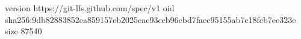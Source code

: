 version https://git-lfs.github.com/spec/v1
oid sha256:9db82883852ea859157eb2025cac93ccb96cbd7faec95155ab7c18fcb7ee323e
size 87540

